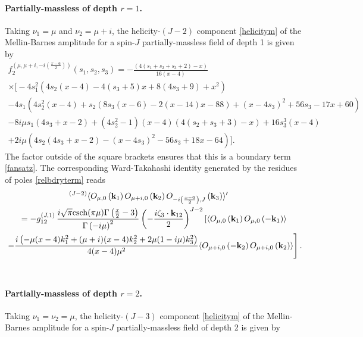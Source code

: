 \documentclass[11pt,a4paper]{article}
\begin{document}
\paragraph{Partially-massless of depth $r=1$.}

Taking $\nu_1=\mu$ and $\nu_2=\mu+i$, the helicity-$\left(J-2\right)$ component \eqref{helicitym} of the Mellin-Barnes amplitude for a spin-$J$ partially-massless field of depth 1 is given by 
\begin{multline}\nonumber
   f^{\left(\mu,\mu+i,-i\left(\frac{x-6}{2}\right)\right)}_2(s_1,s_2,s_3)=-\frac{(4 (s_1+s_2+s_3+2)-x)}{16 (x-4)}\\ \times \Big[-4 s^2_1 \left(4 s_2 (x-4)-4 (s_3+5) x+8 (4 s_3+9)+x^2\right)\\\nonumber
   -4 s_1 \left(4 s^2_2 (x-4)+s_2 (8 s_3 (x-6)-2 (x-14) x-88)+(x-4 s_3)^2+56 s_3-17 x+60\right)\nonumber\\\nonumber
-8 i \mu  s_1 (4 s_3+x-2)+\left(4 s^2_2-1\right) (x-4) (4 (s_2+s_3+3)-x)+16 s^3_3 (x-4)\\
   +2 i \mu  \left(4 s_2 (4 s_3+x-2)-(x-4 s_3)^2-56 s_3+18 x-64\right)\Big].
\end{multline}
The factor outside of the square brackets ensures that this is a boundary term \eqref{fansatz}. The corresponding Ward-Takahashi identity generated by the residues of poles \eqref{relbdryterm} reads
\begin{multline}\label{002PMWard}
 \hspace*{-0.5cm}   {}^{\left(J-2\right)}\langle O_{\mu,0}\left({\bf k}_1\right)O_{\mu+i,0}\left({\bf k}_2\right)O_{-i\left(\frac{x-6}{2}\right),J}\left({\bf k}_3\right)  \rangle^\prime\\=
    -g^{\left(J,1\right)}_{12}\,\frac{i \sqrt{\pi}\text{csch}(\pi  \mu ) \Gamma \left(\frac{x}{2}-3\right)}{\Gamma\left(-i\mu\right)^2}\left(-\frac{i\zeta_3 \cdot {\bf k}_{12}}{2}\right)^{J-2} \left[\langle O_{\mu,0}\left({\bf k}_1\right)O_{\mu,0}\left(-{\bf k}_1\right)\rangle\right. \\\left.-\frac{i\left(-\mu (x-4)k^2_1+(\mu +i) (x-4)k^2_2+2 \mu  (1-i \mu ) k^2_3\right)}{4 (x-4)\mu^2}\langle O_{\mu+i,0}\left(-{\bf k}_2\right)O_{\mu+i,0}\left({\bf k}_2\right)\rangle \right].
\end{multline}\\

\paragraph{Partially-massless of depth $r=2$.} Taking $\nu_1=\nu_2=\mu$, the helicity-$\left(J-3\right)$ component \eqref{helicitym} of the Mellin-Barnes amplitude for a spin-$J$ partially-massless field of depth 2 is given by
\end{document}
